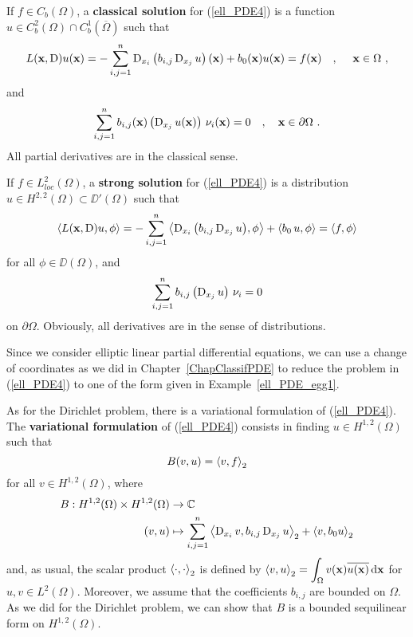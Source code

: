 \begin{defn}
If $f \in C_b(\Omega)$, a {\bfseries classical solution}
 for
(\ref{ell_PDE4}) is a function
$\displaystyle u \in C^2_b(\Omega) \cap C^1_b(\overline{\Omega})$ such that
\[
L(\mathbf{x}, \operatorname{D})u(\mathbf{x}) = -\sum_{i,j=1}^n
\operatorname{D}_{x_i} \left( b_{i,j} \operatorname{D}_{x_j} u \right)(\mathbf{x})
+ b_0(\mathbf{x}) u(\mathbf{x}) = f(\mathbf{x}) \quad , \quad \ \mathbf{x} \in \Omega \ ,
\]
and
\[
\sum_{i,j=1}^n b_{i,j}(\VEC{x}) \left( \diff_{x_j} u(\VEC{x}) \right)
\, \nu_i(\VEC{x})= 0  \quad , \quad \VEC{x} \in \partial \Omega \ .
\]
All partial derivatives are in the classical sense.
\end{defn}

\begin{defn}
If $\displaystyle f\in L_{loc}^2(\Omega)$, a {\bfseries strong solution}
 for
(\ref{ell_PDE4}) is a distribution
$\displaystyle u \in H^{2,2}(\Omega) \subset \DD'(\Omega)$ such that
\[
\left\langle{ L(\mathbf{x},\operatorname{D})u} , {\phi}\right\rangle = -\sum_{i,j=1}^n
\left\langle{\operatorname{D}_{x_i}\left( b_{i,j} \operatorname{D}_{x_j} u \right)} , {\phi}\right\rangle
+ \left\langle{b_0 \, u} , {\phi}\right\rangle = \left\langle{f} , {\phi}\right\rangle
\]
for all $\displaystyle \phi \in \DD(\Omega)$, and
\[
\sum_{i,j=1}^n b_{i,j} \left( \operatorname{D}_{x_j} u \right)\, \nu_i= 0
\]
on $\partial \Omega$.  Obviously, all derivatives
are in the sense of distributions.
\end{defn}

Since we consider elliptic linear partial differential equations, we
can use a change of coordinates as we did
in Chapter~\ref{ChapClassifPDE} to reduce the problem in
(\ref{ell_PDE4}) to one of the form given in
Example~\ref{ell_PDE_egg1}.

As for the Dirichlet problem, there is a variational formulation of
(\ref{ell_PDE4}).  The {\bfseries variational formulation} of
(\ref{ell_PDE4}) consists in finding
$\displaystyle u\in H^{1,2}(\Omega)$ such that
\begin{equation} \label{ell_PDE5}
B(v,u) = \left\langle{v} , {f}\right\rangle_2
\end{equation}
for all $\displaystyle v \in H^{1,2}(\Omega)$, where
\begin{equation} \label{ell_PDE6}
\begin{split}
B : H^{1,2}(\Omega) \times H^{1,2}(\Omega) & \rightarrow \mathbb{C} \\
(v,u) &\mapsto
\sum_{i,j=1}^n \left\langle{\operatorname{D}_{x_i} v} , {b_{i,j} \operatorname{D}_{x_j} u}\right\rangle_2 + \left\langle{v} , {b_0 u}\right\rangle_2
\end{split}
\end{equation}
and, as usual, the scalar product $\left\langle{\cdot} , {\cdot}\right\rangle_2$ is defined by
$\displaystyle \left\langle{v} , {u}\right\rangle_2
= \int_\Omega v(\mathbf{x})\overline{u(\mathbf{x})} \,\mathrm{d}{\mathbf{x}}$ for
$\displaystyle u,v \in L^2(\Omega)$.
Moreover, we assume that the coefficients $b_{i,j}$ are
bounded on $\Omega$.  As we did for the Dirichlet problem, we can show
that $B$ is a bounded sequilinear form on $\displaystyle H^{1,2}(\Omega)$.

